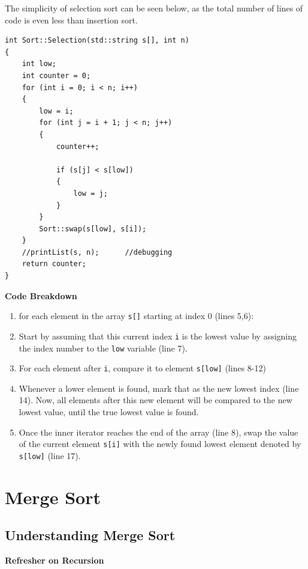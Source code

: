 \documentclass[letterpaper, 10pt]{article}
\begin{document}
The simplicity of selection sort can be seen below, as the total number of lines of code is even less than insertion sort.

\begin{addmargin}[-5em]{1em}
\begin{small}
\begin{verbatim}
int Sort::Selection(std::string s[], int n)
{
	int low;
	int counter = 0;
	for (int i = 0; i < n; i++)
	{
		low = i;
		for (int j = i + 1; j < n; j++)
		{
			counter++;

			if (s[j] < s[low])
			{
				low = j;
			}
		}
		Sort::swap(s[low], s[i]);
	}
	//printList(s, n);		//debugging
	return counter;
}
\end{verbatim}
\end{small}
\end{addmargin}

\begin{center}
    \textbf{Code Breakdown}
\end{center}

\begin{enumerate}
    \item for each element in the array \texttt{s[]} starting at index 0 (lines 5,6):
    \item Start by assuming that this current index \texttt{i} is the lowest value by assigning the index number to the \texttt{low} variable (line 7).
    \item For each element after \texttt{i}, compare it to element \texttt{s[low]} (lines 8-12)
    \item Whenever a lower element is found, mark that as the new lowest index (line 14). Now, all elements after this new element will be compared to the new lowest value, until the true lowest value is found.
    \item Once the inner iterator reaches the end of the array (line 8), swap the value of the current element \texttt{s[i]} with the newly found lowest element denoted by \texttt{s[low]} (line 17).
\end{enumerate}

\section{Merge Sort}
\subsection{Understanding Merge Sort}
\begin{center}
\textbf{Refresher on Recursion}
\end{center}
\end{document}
